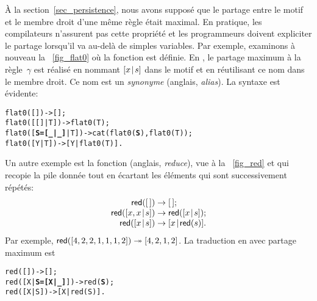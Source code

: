 À la section~\ref{sec_persistence}, nous avons supposé que le partage
entre le motif et le membre droit d'une même règle était maximal. En
pratique, les compilateurs n'assurent pas cette propriété et les
programmeurs doivent expliciter le partage lorsqu'il va au-delà de
simples variables. Par exemple, examinons à nouveau la
\fig~\vref{fig_flat0} où la fonction  est
définie. En \Erlang, le partage maximum à la règle~\(\gamma\) est
réalisé en nommant \([{x}\!\mid\!{s}]\) dans le motif et en réutilisant ce
nom dans le membre droit. Ce nom est un \emph{synonyme} (anglais,
\emph{alias}). La syntaxe est évidente:
\begin{alltt}
flat0(         []) -> [];
flat0(     [[]|T]) -> flat0(T);
flat0([\textbf{S=[\_|\_]}|T]) -> cat(flat0(\textbf{S}),flat0(T));\hfill% \emph{Synonymie}
flat0(      [Y|T]) -> [Y|flat0(T)].
\end{alltt}
  Un
autre exemple est la fonction  (anglais, \emph{reduce}),
vue à la \fig~\vref{fig_red} et qui recopie la pile donnée tout en
écartant les éléments qui sont successivement répétés:
\begin{equation*}
\begin{array}{@{}r@{\;}l@{\;}l@{}}
\fun{red}(\el)           & \rightarrow & \el;\\
\fun{red}(\cons{x,x}{s}) & \rightarrow & \fun{red}(\cons{x}{s});\\
\fun{red}(\cons{x}{s})   & \rightarrow & \cons{x}{\fun{red}(s)}.
\end{array}
\end{equation*}
Par exemple, \(\textsf{red}([4,2,2,1,1,1,2]) \twoheadrightarrow
[4,2,1,2]\). La traduction en \Erlang avec partage maximum est
\begin{alltt}
red(         []) -> [];
red([X|\textbf{S=[X|\_]}]) -> red(\textbf{S});
red(      [X|S]) -> [X|red(S)].
\end{alltt}

